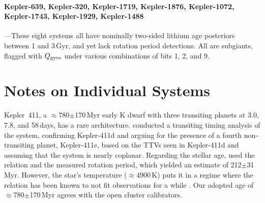 \documentclass[11pt,twocolumn,tighten]{aastex63}
\begin{document}
\paragraph{Kepler-639, Kepler-320, Kepler-1719, Kepler-1876, Kepler-1072, Kepler-1743, Kepler-1929, Kepler-1488}---These eight systems all have nominally two-sided lithium age posteriors between 1 and 3\,Gyr, and yet lack rotation period detections.
All are subgiants, flagged with $Q_{\rm gyro}$ under various combinations of bits 1, 2, and 9.


\section{Notes on Individual Systems}

%

Kepler~411, a $\approx$780$\pm$170\,Myr early K dwarf with three
transiting planets at 3.0, 7.8, and 58\,days, has a rare
architecture.  \citet{2019A&A...624A..15S} conducted a transiting
timing analysis of the system, confirming Kepler-411d and arguing for
the presence of a fourth non-transiting planet, Kepler-411e, based on
the TTVs seen in Kepler-411d and assuming that the system is nearly
coplanar.  Regarding the stellar age, \citet{2019A&A...624A..15S} used
the \citet{2007ApJ...669.1167B} relation and the measured rotation
period, which yielded an estimate of 212$\pm$31\,Myr.  However, the
star's temperature ($\approx$4900\,K) puts it in a regime where the
\citeauthor{2007ApJ...669.1167B} relation has been known to not fit
observations for a while
\citep[e.g.][Fig.~9]{Mamajek_2008}.  Our adopted age of
$\approx$780$\pm$170\,Myr agrees with the open cluster calibrators.






\end{document}
